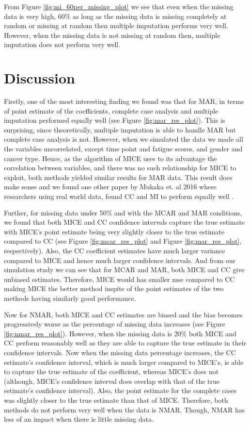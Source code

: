 \documentclass[fleqn,10pt]{wlscirep}\usepackage[]{graphicx}\usepackage[]{color}
\begin{document}
From Figure \ref{fig:mi_60per_missing_plot} we see that even when the missing data is very high, 60\% as long as the missing data is missing completely at random or missing at random then multiple imputation performs very well. However, when the missing data is not missing at random then, multiple imputation does not perform very well. 


\section{Discussion}

Firstly, one of the most interesting finding we found was that for MAR, in terms of point estimate of the coefficients, complete case analysis and multiple imputation performed equally well (see Figure \ref{fig:mar_res_plot}). This is surprising, since theoretically, multiple imputation is able to handle MAR but complete case analysis is not. However, when we simulated the data we made all the variables uncorrelated, except time point and fatigue scores, and gender and cancer type. Hence, as the algorithm of MICE uses to its advantage the correlation between variables, and there was no such relationship for MICE to exploit, both methods yielded similar results for MAR data. This result does make sense and we found one other paper by Mukaka et. al 2016 where researchers using real world data, found CC and MI to perform equally well \cite{mukaka2016using}. 

Further, for missing data under 50\% and with the MCAR and MAR conditions, we found that both MICE and CC confidence intervals capture the true estimate with MICE's point estimate being very slightly closer to the true estimate compared to CC (see Figure \ref{fig:mcar_res_plot} and Figure \ref{fig:mar_res_plot}, respectively). Also, the CC coefficient estimates have much larger variance compared to MICE and hence much larger confidence intervals. And from our simulation study we can see that for MCAR and MAR, both MICE and CC give unbiased estimates. Therefore, MICE would has smaller mse compared to CC making MICE the better method inspite of the point estimates of the two methods having similarly good performance. 

Now for NMAR, both MICE and CC estimates are biased and the bias becomes progressively worse as the percentage of missing data increases (see Figure \ref{fig:nmar_res_plot}). However, when the missing data is 20\% both MICE and CC perform reasonably well as they are able to capture the true estimate in their confidence intervals. Now when the missing data percentage increases, the CC estimate's confidence interval, which is much larger compared to MICE's, is able to capture the true estimate of the coefficient, whereas MICE's does not (although, MICE's confidence interval does overlap with that of the true estimate's confidence interval). Also, the point estimate for the complete cases was slightly closer to the true estimate than that of MICE. Therefore, both methods do not perform very well when the data is NMAR. Though, NMAR has less of an impact when there is little missing data. 
\end{document}
